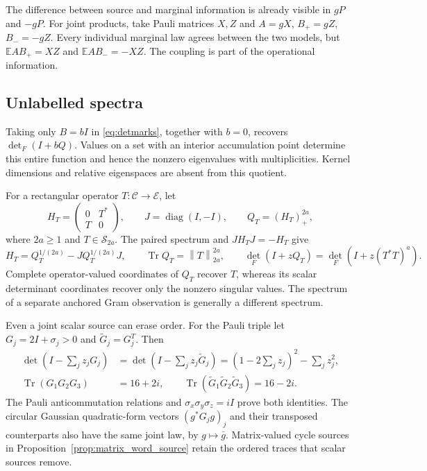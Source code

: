\documentclass[11pt,a4paper]{amsart}
\numberwithin{equation}{section}
\theoremstyle{definition}
\theoremstyle{remark}
\newcommand{\E}{\mathbb E}
\newcommand{\cC}{\mathcal C}
\newcommand{\cE}{\mathcal E}
\newcommand{\Sch}{\mathcal S}
\DeclareMathOperator{\Tr}{Tr}
\DeclareMathOperator{\diag}{diag}
\newcommand{\norm}[1]{\left\lVert#1\right\rVert}
\begin{document}
The difference between source and marginal information is already visible in $gP$ and $-gP$. For joint products, take Pauli matrices $X,Z$ and $A=gX$, $B_+=gZ$, $B_-=-gZ$. Every individual marginal law agrees between the two models, but $\E AB_+=XZ$ and $\E AB_-=-XZ$. The coupling is part of the operational information.

\subsection{Unlabelled spectra}
Taking only $B=bI$ in \eqref{eq:detmarks}, together with $b=0$, recovers $\det_F(I+bQ)$. Values on a set with an interior accumulation point determine this entire function and hence the nonzero eigenvalues with multiplicities. Kernel dimensions and relative eigenspaces are absent from this quotient.

For a rectangular operator $T:\cC\to\cE$, let
\[
 H_T=\begin{pmatrix}0&T^*\\T&0\end{pmatrix},\qquad
 J=\diag(I,-I),\qquad Q_T=(H_T)_+^{2a},
\]
where $2a\ge1$ and $T\in\Sch_{2a}$. The paired spectrum and $JH_TJ=-H_T$ give
\begin{equation}\label{eq:spectralpositive}
 H_T=Q_T^{1/(2a)}-JQ_T^{1/(2a)}J,\qquad
 \Tr Q_T=\norm T_{2a}^{2a},\qquad
 \det_F(I+zQ_T)=\det_F(I+z(T^*T)^a).
\end{equation}
Complete operator-valued coordinates of $Q_T$ recover $T$, whereas its scalar determinant coordinates recover only the nonzero singular values. The spectrum of a separate anchored Gram observation is generally a different spectrum.

Even a joint scalar source can erase order. For the Pauli triple let $G_j=2I+\sigma_j>0$ and $\widetilde G_j=G_j^T$. Then
\begin{align}
 \det\left(I-\sum_jz_jG_j\right)
 &=\det\left(I-\sum_jz_j\widetilde G_j\right)
 =\left(1-2\sum_jz_j\right)^2-\sum_jz_j^2,\label{eq:transposecharacter}\\
 \Tr(G_1G_2G_3)&=16+2i,\qquad
 \Tr(\widetilde G_1\widetilde G_2\widetilde G_3)=16-2i.\label{eq:transposeorientation}
\end{align}
The Pauli anticommutation relations and $\sigma_x\sigma_y\sigma_z=iI$ prove both identities. The circular Gaussian quadratic-form vectors $(g^*G_jg)_j$ and their transposed counterparts also have the same joint law, by $g\mapsto\bar g$. Matrix-valued cycle sources in Proposition~\ref{prop:matrix_word_source} retain the ordered traces that scalar sources remove.
\end{document}
